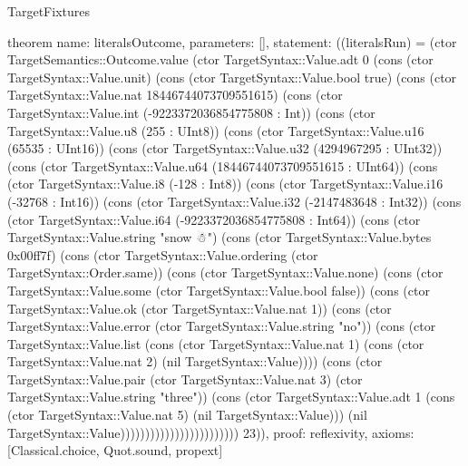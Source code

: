 \begin{lexlean}{TargetFixtures}
\begin{semanticmodule}
theorem{
  name: literalsOutcome,
  parameters: [],
  statement: ((literalsRun) = (ctor TargetSemantics::Outcome.value (ctor TargetSyntax::Value.adt 0 (cons (ctor TargetSyntax::Value.unit) (cons (ctor TargetSyntax::Value.bool true) (cons (ctor TargetSyntax::Value.nat 18446744073709551615) (cons (ctor TargetSyntax::Value.int (-9223372036854775808 : Int)) (cons (ctor TargetSyntax::Value.u8 (255 : UInt8)) (cons (ctor TargetSyntax::Value.u16 (65535 : UInt16)) (cons (ctor TargetSyntax::Value.u32 (4294967295 : UInt32)) (cons (ctor TargetSyntax::Value.u64 (18446744073709551615 : UInt64)) (cons (ctor TargetSyntax::Value.i8 (-128 : Int8)) (cons (ctor TargetSyntax::Value.i16 (-32768 : Int16)) (cons (ctor TargetSyntax::Value.i32 (-2147483648 : Int32)) (cons (ctor TargetSyntax::Value.i64 (-9223372036854775808 : Int64)) (cons (ctor TargetSyntax::Value.string "snow ☃") (cons (ctor TargetSyntax::Value.bytes 0x00ff7f) (cons (ctor TargetSyntax::Value.ordering (ctor TargetSyntax::Order.same)) (cons (ctor TargetSyntax::Value.none) (cons (ctor TargetSyntax::Value.some (ctor TargetSyntax::Value.bool false)) (cons (ctor TargetSyntax::Value.ok (ctor TargetSyntax::Value.nat 1)) (cons (ctor TargetSyntax::Value.error (ctor TargetSyntax::Value.string "no")) (cons (ctor TargetSyntax::Value.list (cons (ctor TargetSyntax::Value.nat 1) (cons (ctor TargetSyntax::Value.nat 2) (nil TargetSyntax::Value)))) (cons (ctor TargetSyntax::Value.pair (ctor TargetSyntax::Value.nat 3) (ctor TargetSyntax::Value.string "three")) (cons (ctor TargetSyntax::Value.adt 1 (cons (ctor TargetSyntax::Value.nat 5) (nil TargetSyntax::Value))) (nil TargetSyntax::Value)))))))))))))))))))))))) 23)),
  proof: reflexivity{},
  axioms: [Classical.choice, Quot.sound, propext]
}


\end{semanticmodule}
\end{lexlean}
